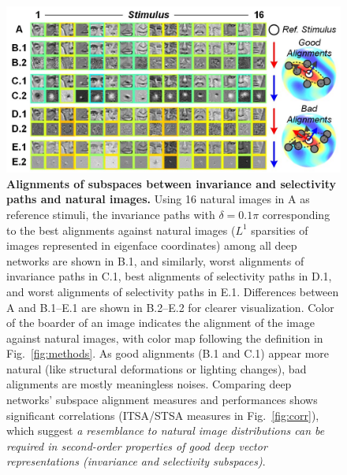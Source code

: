 \documentclass[10pt,twocolumn,letterpaper]{article}
\begin{document}
\begin{figure}
\begin{center}
\includegraphics[width=\columnwidth, trim=1em 0 1em 0]{Figs/pic3.jpg} 
\end{center}
\caption{{\bf Alignments of subspaces between invariance and selectivity paths and natural images.}
Using 16 natural images in A as reference stimuli, the invariance paths with $\delta = 0.1\pi$ corresponding to the best alignments against natural images (\ie $L^1$ sparsities of images represented in eigenface coordinates) among all deep networks are shown in B.1, and similarly, worst alignments of invariance paths in C.1, best alignments of selectivity paths in D.1, and worst alignments of selectivity paths in E.1.
Differences between A and B.1--E.1 are shown in B.2--E.2 for clearer visualization.
Color of the boarder of an image indicates the alignment of the image against natural images, with color map following the definition in Fig.~\ref{fig:methods}.
As good alignments (B.1 and C.1) appear more natural (like structural deformations or lighting changes), bad alignments are mostly meaningless noises.
Comparing deep networks' subspace alignment measures and performances shows significant correlations (ITSA/STSA measures in Fig.~\ref{fig:corr}), which suggest \emph{a resemblance to natural image distributions can be required in second-order properties of good deep vector representations (\ie invariance and selectivity subspaces)}.
} %
\label{fig:align}
\end{figure}
\end{document}
